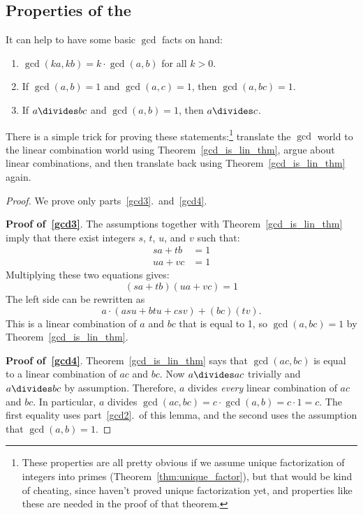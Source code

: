 \begin{editingnotes}
\subsection{Properties of the }

It can help to have some basic $\gcd$ facts on hand:

\begin{lemma}\label{lem:gcd-hold} 
\begin{enumerate}
\item\label{gcd2} $\gcd(k a, k b) = k \cdot \gcd(a, b)$ for all $k > 0$.
\item\label{gcd3} If $\gcd(a, b) = 1$ and $\gcd(a, c) = 1$, then $\gcd(a, bc) = 1$.
\item\label{gcd4} If $a \divides b c$ and $\gcd(a, b) = 1$, then $a \divides c$.

\end{enumerate}
\end{lemma}

There is a simple trick for proving these statements:\footnote{These
  properties are all pretty obvious if we assume unique factorization
  of integers into primes (Theorem~\ref{thm:unique_factor}), but that
  would be kind of cheating, since haven't proved unique factorization
  yet, and properties like these are needed in the proof of that
  theorem.} translate the $\gcd$ world to the linear combination world
using Theorem~\ref{gcd_is_lin_thm}, argue about linear combinations,
and then translate back using Theorem~\ref{gcd_is_lin_thm} again.

\begin{proof} We prove only parts~\ref{gcd3}.\ and~\ref{gcd4}.

\textbf{Proof of~\ref{gcd3}}.  The assumptions together with
Theorem~\ref{gcd_is_lin_thm} imply that there exist integers $s$, $t$, $u$,
and $v$ such that:
\begin{align*}
s a + t b & = 1 \\
u a + v c & = 1
\end{align*}
Multiplying these two equations gives:
\[
(s a + t b)(u a + v c) = 1
\]
The left side can be rewritten as
\[
a \cdot (a s u + b t u + c s v) + (bc) (t v).
\]
This is a linear combination of $a$ and $b c$ that is equal to 1, so
$\gcd(a, bc) = 1$ by Theorem~\ref{gcd_is_lin_thm}.

\textbf{Proof of~\ref{gcd4}}.  Theorem~\ref{gcd_is_lin_thm} says that
$\gcd(ac, bc)$ is equal to a linear combination of $ac$ and $bc$.  Now
$a \divides ac$ trivially and $a \divides bc$ by assumption.
Therefore, $a$ divides \emph{every} linear combination of $ac$ and
$bc$.  In particular, $a$ divides $\gcd(ac, bc) = c \cdot \gcd(a, b) =
c\cdot 1 = c$.  The first equality uses part~\ref{gcd2}.\ of this
lemma, and the second uses the assumption that $\gcd(a, b) = 1$.
\end{proof}
\end{editingnotes}

